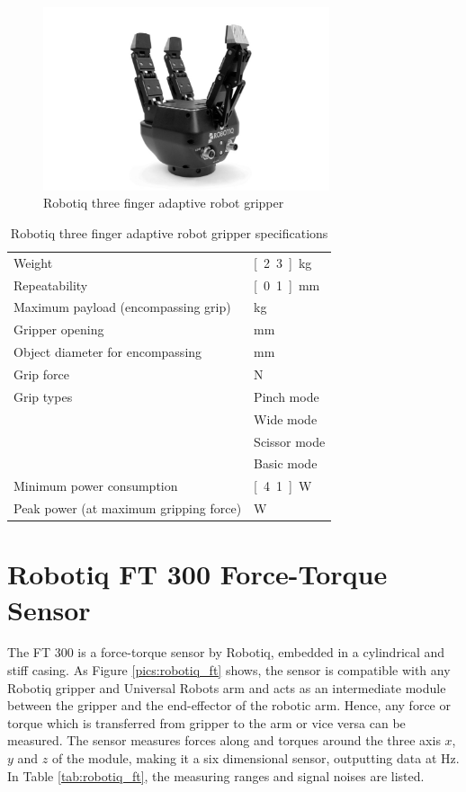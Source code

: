 \begin{figure}[h]
   \centering
   \includegraphics[width=0.75\textwidth]{images/robotiq_gripper.jpg}
   \caption{Robotiq three finger adaptive robot gripper}
   \label{pics:robotiq_gripper}
\end{figure}

\begin{table}[h]
\begin{center}
 \caption{Robotiq three finger adaptive robot gripper specifications}\vspace{1ex}
 \label{tab:robotiq_gripper}
 \begin{tabular}{ll}
 \hline
 Weight & \unit[2.3]{kg}\\
 Repeatability & \unit[0.1]{mm} \\
 Maximum payload (encompassing grip) & \unit[10]{kg}\\
 Gripper opening & \unit[0 to 155]{mm} \\
 Object diameter for encompassing & \unit[20 to 155]{mm}\\
 Grip force & \unit[30 to 70]{N} \\
 Grip types & Pinch mode \\
 & Wide mode \\
 & Scissor mode \\
 & Basic mode \\
 Minimum power consumption & \unit[4.1]{W} \\
 Peak power (at maximum gripping force) & \unit[36]{W}\\
 \hline
 \end{tabular}
\end{center}
\end{table}

\section{Robotiq FT 300 Force-Torque Sensor}
	\label{sec:ft300}
The FT 300 is a force-torque sensor by Robotiq, embedded in a cylindrical and stiff casing. As Figure \ref{pics:robotiq_ft} shows, the sensor is compatible with any Robotiq gripper and Universal Robots arm and acts as an intermediate module between the gripper and the end-effector of the robotic arm. Hence, any force or torque which is transferred from gripper to the arm or vice versa can be measured. The sensor measures forces along and torques around the three axis $x$, $y$ and $z$ of the module, making it a six dimensional sensor, outputting data at \unit[100]{Hz}. In Table \ref{tab:robotiq_ft}, the measuring ranges and signal noises are listed.

